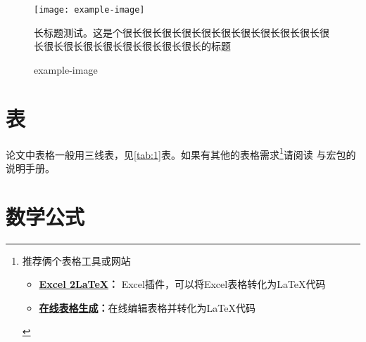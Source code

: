 \documentclass{imutthesis}
\begin{document}
\begin{figure}[H]
	\centering
	\texttt{[image: example-image]}
	\caption{长标题测试。这是个很长很长很长很长很长很长很长很长很长很长很长很长很长很长很长很长很长很长很长的标题}
\end{figure}

\begin{figure}[H]
	\centering
	\quad
	\quad
	\quad
	\caption{example-image}
\end{figure}

\section{表}
论文中表格一般用三线表，见\ref{tab:1}表。如果有其他的表格需求\footnote{推荐俩个表格工具或网站\begin{itemize}
		\item \textbf{\href{https://www.ctan.org/tex-archive/support/excel2latex/}{Excel 2\LaTeX}\;：
		}Excel插件，可以将Excel表格转化为\LaTeX 代码
		\item \textbf{\href{www.tablesgenerator.com}{在线表格生成}\;：}在线编辑表格并转化为\LaTeX 代码
\end{itemize}}请阅读 与宏包的说明手册。

\begin{table}[H]
	\centering
	\caption{跑马灯I/O分配表}\label{tab:1}
\end{table}


\section{数学公式}
\end{document}
